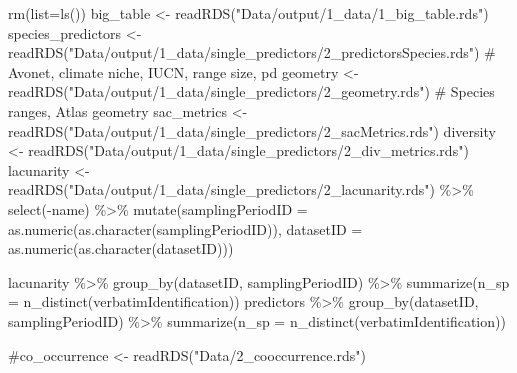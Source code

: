 \documentclass[
  letterpaper,
  DIV=11,
  numbers=noendperiod]{scrreprt}
\newenvironment{Shaded}{\begin{snugshade}}{\end{snugshade}}
\newcommand{\AttributeTok}[1]{\textcolor[rgb]{0.40,0.45,0.13}{#1}}
\newcommand{\CommentTok}[1]{\textcolor[rgb]{0.37,0.37,0.37}{#1}}
\newcommand{\FunctionTok}[1]{\textcolor[rgb]{0.28,0.35,0.67}{#1}}
\newcommand{\NormalTok}[1]{\textcolor[rgb]{0.00,0.23,0.31}{#1}}
\newcommand{\OtherTok}[1]{\textcolor[rgb]{0.00,0.23,0.31}{#1}}
\newcommand{\SpecialCharTok}[1]{\textcolor[rgb]{0.37,0.37,0.37}{#1}}
\newcommand{\StringTok}[1]{\textcolor[rgb]{0.13,0.47,0.30}{#1}}
\begin{document}
\begin{Shaded}
\begin{Highlighting}[]
\FunctionTok{rm}\NormalTok{(}\AttributeTok{list=}\FunctionTok{ls}\NormalTok{())}
\NormalTok{big\_table }\OtherTok{\textless{}{-}} \FunctionTok{readRDS}\NormalTok{(}\StringTok{"Data/output/1\_data/1\_big\_table.rds"}\NormalTok{)}
\NormalTok{species\_predictors }\OtherTok{\textless{}{-}} \FunctionTok{readRDS}\NormalTok{(}\StringTok{"Data/output/1\_data/single\_predictors/2\_predictorsSpecies.rds"}\NormalTok{) }\CommentTok{\# Avonet, climate niche, IUCN, range size, pd}
\NormalTok{geometry }\OtherTok{\textless{}{-}} \FunctionTok{readRDS}\NormalTok{(}\StringTok{"Data/output/1\_data/single\_predictors/2\_geometry.rds"}\NormalTok{) }\CommentTok{\# Species ranges, Atlas geometry}
\NormalTok{sac\_metrics }\OtherTok{\textless{}{-}} \FunctionTok{readRDS}\NormalTok{(}\StringTok{"Data/output/1\_data/single\_predictors/2\_sacMetrics.rds"}\NormalTok{)}
\NormalTok{diversity }\OtherTok{\textless{}{-}} \FunctionTok{readRDS}\NormalTok{(}\StringTok{"Data/output/1\_data/single\_predictors/2\_div\_metrics.rds"}\NormalTok{)}
\NormalTok{lacunarity }\OtherTok{\textless{}{-}} \FunctionTok{readRDS}\NormalTok{(}\StringTok{"Data/output/1\_data/single\_predictors/2\_lacunarity.rds"}\NormalTok{) }\SpecialCharTok{\%\textgreater{}\%}
  \FunctionTok{select}\NormalTok{(}\SpecialCharTok{{-}}\NormalTok{name) }\SpecialCharTok{\%\textgreater{}\%}
  \FunctionTok{mutate}\NormalTok{(}\AttributeTok{samplingPeriodID =} \FunctionTok{as.numeric}\NormalTok{(}\FunctionTok{as.character}\NormalTok{(samplingPeriodID)), }
         \AttributeTok{datasetID =} \FunctionTok{as.numeric}\NormalTok{(}\FunctionTok{as.character}\NormalTok{(datasetID)))}

\NormalTok{lacunarity }\SpecialCharTok{\%\textgreater{}\%} \FunctionTok{group\_by}\NormalTok{(datasetID, samplingPeriodID) }\SpecialCharTok{\%\textgreater{}\%} \FunctionTok{summarize}\NormalTok{(}\AttributeTok{n\_sp =} \FunctionTok{n\_distinct}\NormalTok{(verbatimIdentification))}
\NormalTok{predictors }\SpecialCharTok{\%\textgreater{}\%} \FunctionTok{group\_by}\NormalTok{(datasetID, samplingPeriodID) }\SpecialCharTok{\%\textgreater{}\%} \FunctionTok{summarize}\NormalTok{(}\AttributeTok{n\_sp =} \FunctionTok{n\_distinct}\NormalTok{(verbatimIdentification))}

\CommentTok{\#co\_occurrence \textless{}{-} readRDS("Data/2\_cooccurrence.rds")}


\end{Highlighting}
\end{Shaded}
\end{document}
